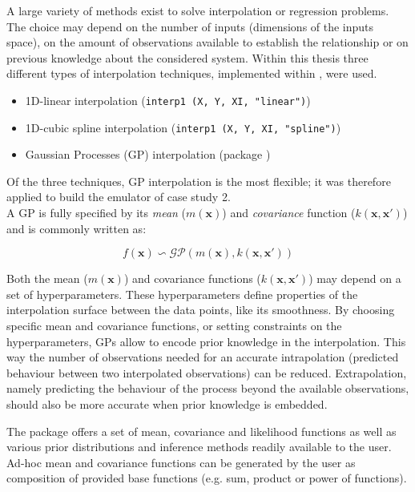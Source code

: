 A large variety of methods exist to solve interpolation or regression problems. The choice may depend on the number of inputs (dimensions of the inputs space), on the amount of observations available to establish the relationship or on previous knowledge about the considered system.
Within this thesis three different types of interpolation techniques, implemented within , were used.

\begin{itemize}
\itemsep0em
  \item 1D-linear interpolation (\texttt{interp1 (X, Y, XI, "linear")})
  \item 1D-cubic spline interpolation (\texttt{interp1 (X, Y, XI, "spline")})
  \item Gaussian Processes (GP) interpolation (package )
\end{itemize}

Of the three techniques, GP interpolation is the most flexible; it was therefore applied to build the emulator of case study 2.\\

A GP is fully specified by its \emph{mean} ($m(\bm{x})$) and \emph{covariance} function ($k(\bm{x},\bm{x}')$) \autocite{rasmussen_gaussian_2006} and is commonly written as:

\begin{equation}
  f(\bm{x}) \backsim \mathcal{GP}\left(m(\bm{x}), k(\bm{x},\bm{x}')\right)
\end{equation}

Both the mean ($m(\bm{x})$) and covariance functions ($k(\bm{x},\bm{x}')$) may depend on a set of hyperparameters. These hyperparameters define properties of the interpolation surface between the data points, like its smoothness.
By choosing specific mean and covariance functions, or setting constraints on the hyperparameters, GPs allow to encode prior knowledge in the interpolation.
This way the number of observations needed for an accurate intrapolation (predicted behaviour between two interpolated observations) can be reduced.
Extrapolation, namely predicting the behaviour of the process beyond the available observations, should also be more accurate when prior knowledge is embedded.

The package  offers a set of mean, covariance and likelihood functions as well as various prior distributions and inference methods readily available to the user.
Ad-hoc mean and covariance functions can be generated by the user as composition of provided base functions (e.g. sum, product or power of functions).

